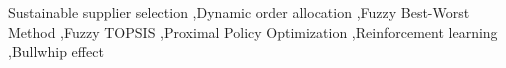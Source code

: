 \begin{keyword}
Sustainable supplier selection \sep Dynamic order allocation \sep Fuzzy Best-Worst Method \sep Fuzzy TOPSIS \sep Proximal Policy Optimization \sep Reinforcement learning \sep Bullwhip effect
\end{keyword}